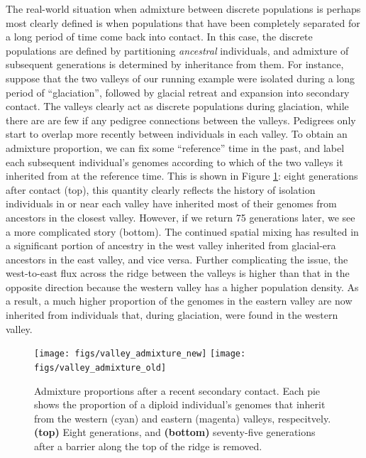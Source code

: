 \documentclass{ar-1col}
\begin{document}
The real-world situation when admixture between discrete populations 
is perhaps most clearly defined is when populations that have been completely separated
for a long period of time come back into contact.
In this case, the discrete populations are defined by partitioning \emph{ancestral} individuals,
and admixture of subsequent generations is determined by inheritance from them.
For instance, suppose that 
the two valleys of our running example
were isolated during a long period of ``glaciation'',
followed by glacial retreat and expansion into secondary contact.
The valleys clearly act as discrete populations during glaciation, 
while there are are few if any pedigree connections between the valleys.
Pedigrees only start to overlap more recently between individuals in each valley.
To obtain an admixture proportion,
we can fix some ``reference'' time in the past,
and label each subsequent individual's genomes
according to which of the two valleys it inherited from at the reference time.
This is shown in Figure \ref{postglacial_expansion}:
eight generations after contact (top),
this quantity clearly reflects the history of isolation 
individuals in or near each valley have inherited most of their genomes 
from ancestors in the closest valley.
However, if we return 75 generations later, 
we see a more complicated story (bottom).
The continued spatial mixing has resulted in a significant 
portion of ancestry in the west valley inherited from 
glacial-era ancestors in the east valley, 
and vice versa.
Further complicating the issue, 
the west-to-east flux across the ridge between the valleys 
is higher than that in the opposite direction 
because the western valley has a higher population density. 
As a result, a much higher proportion of the genomes
in the eastern valley are now inherited 
from individuals that, 
during glaciation, were found in the western valley.

\begin{figure}[H]
    \centering
        \texttt{[image: figs/valley\_admixture\_new]}
        \texttt{[image: figs/valley\_admixture\_old]}
        \caption{
            Admixture proportions after a recent secondary contact.
            Each pie shows the proportion of a diploid individual's genomes
            that inherit from the western (cyan) and eastern (magenta) valleys, respecitvely.
            \textbf{(top)} Eight generations, and
            \textbf{(bottom)} seventy-five generations 
            after a barrier along the top of the ridge is removed.
        }
        \label{postglacial_expansion}
\end{figure}
\end{document}
